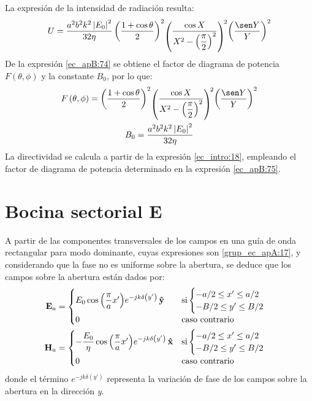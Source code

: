 La expresión de la intensidad de radiación resulta:
\begin{align}
\raisebox{2.31mm}{$U = \dfrac{a^2b^2k^2\left|E_0\right|^2}{32\eta}\left(\dfrac{1 + \cos\theta}{2}\right)^2$}\!\left(\raisebox{2.31mm}{$\dfrac{\cos X}{X^2 - \left(\dfrac{\pi}{2}\right)^2}$}\right)^{\!2}\!\raisebox{2.31mm}{$\left(\dfrac{\sen Y}{Y}\right)^2$}
\label{ec_apB:74}
\end{align}
De la expresión \eqref{ec_apB:74} se obtiene el factor de diagrama de potencia $F\left(\theta,\phi\right)$ y la constante $B_0$, por lo que:
\begin{gather}
\raisebox{2.31mm}{$F\left(\theta,\phi\right) = \left(\dfrac{1 + \cos\theta}{2}\right)^2$}\!\left(\raisebox{2.31mm}{$\dfrac{\cos X}{X^2 - \left(\dfrac{\pi}{2}\right)^2}$}\right)^{\!2}\!\raisebox{2.31mm}{$\left(\dfrac{\sen Y}{Y}\right)^2$}
\label{ec_apB:75}\\
B_0 = \frac{a^2b^2k^2\left|E_0\right|^2}{32\eta}
\label{ec_apB:76}
\end{gather}
La directividad se calcula a partir de la expresión \eqref{ec_intro:18}, empleando el factor de diagrama de potencia determinado en la expresión \eqref{ec_apB:75}.

\section{Bocina sectorial E}
\label{sec_apendice_b_boci_sece}

A partir de las componentes transversales de los campos en una guía de onda rectangular para modo dominante, cuyas expresiones son \eqref{grup_ec_apA:17}, y considerando que la fase no es uniforme sobre la abertura, se deduce que los campos sobre la abertura están dados por:
\begin{align}
\mathbf{E}_a &= 
\begin{cases}
\makebox[0pt][l]{$E_0\cos\left(\dfrac{\pi}{a}x'\right)\!e^{-jk\delta\left(y'\right)}\,\versor{y}$}\hphantom{-\dfrac{E_0}{\eta}\cos\left(\dfrac{\pi}{a}x'\right)\!e^{-jk\delta\left(y'\right)}\,\versor{x}} &\text{si}
\begin{cases} 
-a/2 \leq x' \leq a/2\\
-B/2 \leq y' \leq B/2
\end{cases}\\
0  &\text{caso contrario}
\end{cases}
\label{ec_apB:77}\\
\mathbf{H}_a &= 
\begin{cases} 
-\dfrac{E_0}{\eta}\cos\left(\dfrac{\pi}{a}x'\right)\!e^{-jk\delta\left(y'\right)}\,\versor{x} &\text{si}
\begin{cases} 
-a/2 \leq x' \leq a/2\\
-B/2 \leq y' \leq B/2
\end{cases}\\
0  & \text{caso contrario}
\end{cases}
\label{ec_apB:78}
\end{align}
donde el término $e^{-jk\delta\left(y'\right)}$ representa la variación de fase de los campos sobre la abertura en la dirección \emph{y}.

